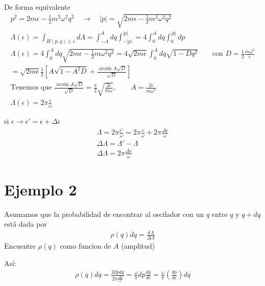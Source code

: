 \documentclass{article}
\begin{document}
De forma equivalente 
\begin{gather*}
  p ^2 = 2m\epsilon - \frac{1}{2} m^2 \omega ^2 q ^2 \quad \rightarrow \quad \left|p \right| = \sqrt{2m\epsilon - \frac{1}{2} m^2 \omega ^2 q ^2} \\
  \Lambda(\epsilon) = \int_{H(p,q)\leq \epsilon}^{} d\Lambda = \int_{-A }^{A }dq \int_{- \left|p \right|}^{\left|p \right|} = 4 \int_{0 }^{A } dq \int_{0 }^{\left|p \right|}dp \\
  \Lambda(\epsilon) = 4 \int_{0 }^{A } dq \sqrt{2m\epsilon - \frac{1}{2} m \omega ^2 q ^2} = 4 \sqrt{2m \epsilon} \int_{0 }^{A } dq \sqrt{1- D q ^2} \qquad \text{con }D = \frac{1}{2} \frac{m \omega ^2}{\epsilon}\\
  = \sqrt{2m \epsilon} \frac{1}{2} \left[ A \sqrt{1 - A ^2 D } + \frac{\arcsin{A \sqrt{D } }}{\sqrt{D } }\right]  \\
  \text{Tenemos que } \frac{\arcsin A \sqrt{D } }{\sqrt{D } } = \frac{\pi}{2} \sqrt{\frac{2 \epsilon}{m\omega} } , \qquad A = \frac{2\epsilon}{m \omega^2}\\
  \Lambda(\epsilon) = 2\pi \frac{\epsilon}{\omega}
\end{gather*}

\hfill 

\hfill 

si $ \epsilon \rightarrow \epsilon' = \epsilon + \Delta \epsilon $ 
\begin{gather*}
  \Lambda = 2\pi \frac{\epsilon' }{\omega} = 2\pi \frac{\epsilon}{\omega} + 2\pi \frac{\Delta \epsilon}{\omega}\\
  \Delta \Lambda = \Lambda' - \Lambda \\
  \Delta \Lambda  = 2\pi \frac{\Delta \epsilon}{\omega}
\end{gather*}

\section{Ejemplo 2 }
Asumamos que la probabilidad de encontrar al oscilador con un $ q  $ entre $ q  $ y $ q+dq  $ está dada por 
\begin{gather*}
  \rho(q) dq = \frac{d \Lambda}{\Delta \Lambda}
\end{gather*}
Encuentre $ \rho(q )  $ como funcion de $ A  $ (amplitud)

Así: 
\begin{gather*}
  \rho(q) dq = \frac{2 dp dq }{2\pi \frac{\Delta\epsilon}{\omega}} = \frac{\omega}{\pi} dp \frac{dq }{d\epsilon} = \frac{\omega}{\pi} \left(\frac{dp }{d\epsilon}\right)dq  
\end{gather*}
\end{document}
